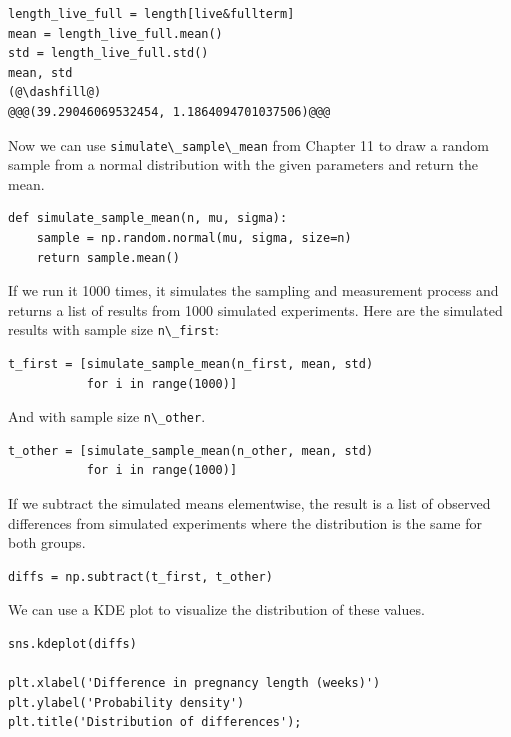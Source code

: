 \begin{lstlisting}[]
length_live_full = length[live&fullterm]
mean = length_live_full.mean()
std = length_live_full.std()
mean, std
(@\dashfill@)
@@@(39.29046069532454, 1.1864094701037506)@@@
\end{lstlisting}

Now we can use \passthrough{\lstinline!simulate\_sample\_mean!} from
Chapter 11 to draw a random sample from a normal distribution with the
given parameters and return the mean.

\begin{lstlisting}[]
def simulate_sample_mean(n, mu, sigma):
    sample = np.random.normal(mu, sigma, size=n)
    return sample.mean()
\end{lstlisting}

If we run it 1000 times, it simulates the sampling and measurement
process and returns a list of results from 1000 simulated experiments.
Here are the simulated results with sample size
\passthrough{\lstinline!n\_first!}:

\begin{lstlisting}[]
t_first = [simulate_sample_mean(n_first, mean, std)
           for i in range(1000)]
\end{lstlisting}

And with sample size \passthrough{\lstinline!n\_other!}.

\begin{lstlisting}[]
t_other = [simulate_sample_mean(n_other, mean, std)
           for i in range(1000)]
\end{lstlisting}

If we subtract the simulated means elementwise, the result is a list of
observed differences from simulated experiments where the distribution
is the same for both groups.

\begin{lstlisting}[]
diffs = np.subtract(t_first, t_other)
\end{lstlisting}

We can use a KDE plot to visualize the distribution of these values.

\begin{lstlisting}[]
sns.kdeplot(diffs)

plt.xlabel('Difference in pregnancy length (weeks)')
plt.ylabel('Probability density')
plt.title('Distribution of differences');
\end{lstlisting}

